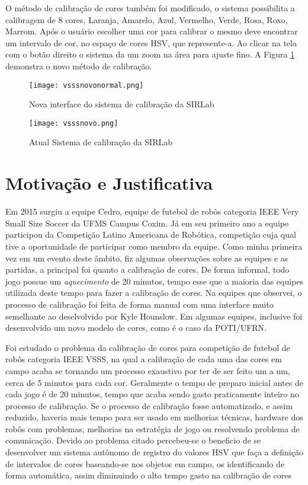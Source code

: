 O método de calibração de cores também foi modificado, o sistema possibilita a calibragem de 8 cores, Laranja, Amarelo, Azul, Vermelho, Verde, Rosa, Roxo, Marrom\cite{VSSVision}. Após o usuário escolher uma cor para calibrar o mesmo deve encontrar um intervalo de cor, no espaço de cores HSV, que represente-a. Ao clicar na tela com o botão direito o sistema da um zoom na área para ajuste fino. A Figura \ref{SIRLabNovaCalibracao} demonstra o novo método de calibração.
\begin{figure}[H]
\begin{minipage}[H]{0.45\linewidth}
\hspace{0.5cm}
\centering
\texttt{[image: vsssnovonormal.png]}
\caption{Nova interface do sistema de calibração da SIRLab\cite{VSSVision}}
\label{SIRLabNova}
\end{minipage}
\hspace{0.5cm}
\begin{minipage}[H]{0.40\linewidth}
\centering
\texttt{[image: vsssnovo.png]}
\caption{Atual Sistema de calibração da SIRLab\cite{VSSVision}}
\label{SIRLabNovaCalibracao}
\end{minipage}
\end{figure}	

\section{Motivação e Justificativa}
Em 2015 surgiu a equipe Cedro, equipe de futebol de robôs categoria IEEE Very Small Size Soccer da UFMS Campus Coxim. Já em seu primeiro ano a equipe participou da Competição Latino Americana de Robótica, competição cuja qual tive a oportunidade de participar como membro da equipe. Como minha primeira vez em um evento deste âmbito, fiz algumas observações sobre as equipes e as partidas, a principal foi quanto a calibração de cores. De forma informal, todo jogo possue um \emph{aquecimento} de 20 minutos, tempo esse que a maioria das equipes utilizada deste tempo para fazer a calibração de cores. Na equipes que observei, o processo de calibração foi feita de forma manual com uma interface muito semelhante ao deselvolvido por Kyle Hounslow\cite{YouTube}. Em algumas equipes, inclusive foi desenvolvido um novo modelo de cores, como é o caso da POTI/UFRN\cite{Martins:2007}.

Foi estudado o problema da calibração de cores para competição de futebol de robôs categoria IEEE VSSS, na qual a calibração de cada uma das cores em campo acaba se tornando um processo exaustivo por ter de ser feito um a um, cerca de 5 minutos para cada cor. Geralmente o tempo de preparo inicial antes de cada jogo é de 20 minutos, tempo que acaba sendo gasto praticamente inteiro no processo de calibração. Se o processo de calibração fosse automatizado, e assim reduzido, haveria mais tempo para ser usado em melhorias técnicas, hardware dos robôs com problemas, melhorias na estratégia de jogo ou resolvendo problema de comunicação. Devido ao problema citado percebeu-se o beneficio de se desenvolver um sistema autônomo de registro do valores HSV que faça a definição de intervalos de cores baseando-se nos objetos em campo, os identificando de forma automática, assim diminuindo o alto tempo gasto na calibração de cores 

